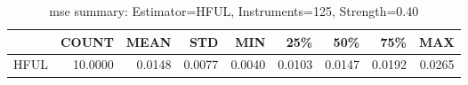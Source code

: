 \begin{table}[ht]
\centering
\caption{mse summary: Estimator=HFUL, Instruments=125, Strength=0.40}
\begin{tabular}{lrrrrrrrr}
\toprule
 & COUNT & MEAN & STD & MIN & 25\% & 50\% & 75\% & MAX \\
\midrule
HFUL & 10.0000 & 0.0148 & 0.0077 & 0.0040 & 0.0103 & 0.0147 & 0.0192 & 0.0265 \\
\bottomrule
\end{tabular}
\end{table}
